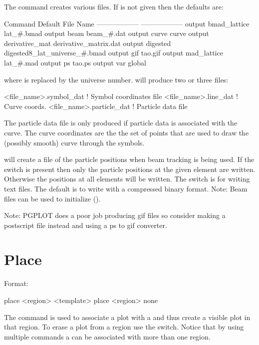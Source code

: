 \vskip 0.2in 
The  command creates various files. If
 is not given then the defaults are:
\begin{example}
  Command                         Default File Name
  ------------------              ------------------
  output bmad_lattice             lat_#.bmad
  output beam                     beam_#.dat
  output curve                    curve
  output derivative_mat           derivative_matrix.dat              
  output digested                 digested8_lat_universe_#.bmad
  output gif                      tao.gif
  output mad_lattice              lat_#.mad
  output ps                       tao.ps
  output var                      global%
\end{example}
where \vn{\#} is replaced by the universe number.  will produce two or three files: 
\begin{example}
  <file_name>.symbol_dat    ! Symbol coordinates file
  <file_name>.line_dat      ! Curve coords.
  <file_name>.particle_dat  ! Particle data file
\end{example}
The particle data file is only produced if particle
data is associated with the curve.
The curve coordinates are the the set of points that are used to draw the
(possibly smooth) curve through the symbols.

 will create a file of the particle positions when
beam tracking is being used. If the switch  is present then
only the particle positions at the given element are written. 
Otherwise the positions at all elements will be written. The
 switch is for writing text files. The default is to write
with a compressed binary format.  Note: Beam files can be used to
initialize \tao (). 

Note: PGPLOT does a poor job producing gif files so consider
making a postscript file instead and using a ps to gif converter.

\section{Place}
\label{s:place}

Format:
\begin{example}
  place <region> <template>
  place <region> none
\end{example}

\vskip 0.2in 
The  command is used to associate a  plot
with a  and thus create a visible plot in that region. To
erase a plot from a region use the  switch. Notice that by
using multiple  commands a  can be associated
with more than one region.


